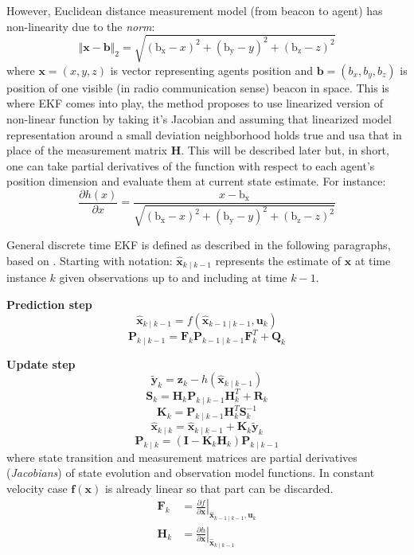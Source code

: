 However, Euclidean distance measurement model (from beacon to agent) has non-linearity due to the \emph{norm}:
$$
    \Vert\boldsymbol{x}-\boldsymbol{b}\Vert_2 = \sqrt{{\left(\mathrm{b_x}-x\right)}^2+{\left(\mathrm{b_y}-y\right)}^2+{\left(\mathrm{b_z}-z\right)}^2}
$$
where $\boldsymbol{x} = (x,y,z)$ is vector representing agents position and $\boldsymbol{b} = (b_x,b_y,b_z)$ is position of one visible (in radio communication sense) beacon in space. This is where EKF comes into play, the method proposes to use linearized version of non-linear function by taking it's Jacobian and assuming that linearized model representation around a small deviation neighborhood holds true and usa that in place of the measurement matrix $\boldsymbol{H}$. This will be described later but, in short, one can take partial derivatives of the function with respect to each agent's position dimension and evaluate them at current state estimate. For instance:
$$
    \frac{\partial h(x)}{\partial x} = \frac{x-\mathrm{b_x}}{\sqrt{{\left(\mathrm{b_x}-x\right)}^2+{\left(\mathrm{b_y}-y\right)}^2+{\left(\mathrm{b_z}-z\right)}^2}}
$$

General discrete time EKF is defined as described in the following paragraphs, based on \cite{probrobotics}. Starting with notation: $\hat{\mathbf{x}}_{k \mid k-1}$ represents the  estimate of $\mathbf{x}$ at time instance $k$ given observations up to and including at time $k-1$. \smallskip

\textbf{Prediction step} \smallskip
$$\hat{\boldsymbol{x}}_{k \mid k-1}=f\left(\hat{\boldsymbol{x}}_{k-1 \mid k-1}, \boldsymbol{u}_k\right)$$
$$\boldsymbol{P}_{k \mid k-1}=\boldsymbol{F}_k \boldsymbol{P}_{k-1 \mid k-1} \boldsymbol{F}_k^T+\boldsymbol{Q}_k$$

\textbf{Update step} \smallskip
$$\tilde{\boldsymbol{y}}_k=\boldsymbol{z}_k-h\left(\hat{\boldsymbol{x}}_{k \mid k-1}\right)$$
$$\boldsymbol{S}_k=\boldsymbol{H}_k \boldsymbol{P}_{k \mid k-1} \boldsymbol{H}_k^T+\boldsymbol{R}_k$$
$$\boldsymbol{K}_k=\boldsymbol{P}_{k \mid k-1} \boldsymbol{H}_k^T \boldsymbol{S}_k^{-1}$$
$$\hat{\boldsymbol{x}}_{k \mid k}=\hat{\boldsymbol{x}}_{k \mid k-1}+\boldsymbol{K}_k \tilde{\boldsymbol{y}}_k$$
$$\boldsymbol{P}_{k \mid k}=\left(\boldsymbol{I}-\boldsymbol{K}_k \boldsymbol{H}_k\right) \boldsymbol{P}_{k \mid k-1}$$
where state transition and measurement matrices are partial derivatives (\emph{Jacobians}) of state evolution and observation model functions. In constant velocity case $\boldsymbol{f}(\boldsymbol{x})$ is already linear so that part can be discarded.
$$
    \begin{aligned}
        \boldsymbol{F}_k & =\left.\frac{\partial f}{\partial \boldsymbol{x}}\right|_{\hat{\boldsymbol{x}}_{k-1 \mid k-1}, \boldsymbol{u}_k} \\
        \boldsymbol{H}_k & =\left.\frac{\partial h}{\partial \boldsymbol{x}}\right|_{\hat{\boldsymbol{x}}_{k \mid k-1}}
    \end{aligned}
$$

